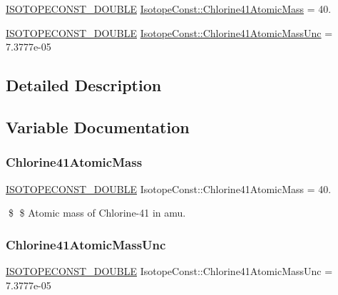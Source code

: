 \begin{DoxyCompactItemize}
\item 
\mbox{\hyperlink{group___isotope_const-_macros_ga8f45a7272ce02c0b4c65c44636ed719a}{I\+S\+O\+T\+O\+P\+E\+C\+O\+N\+S\+T\+\_\+\+D\+O\+U\+B\+LE}} \mbox{\hyperlink{group___isotope_const-_chlorine-_cl41_gad20dfc910df534dfd0835569b4ff3f56}{Isotope\+Const\+::\+Chlorine41\+Atomic\+Mass}} = 40.
\item 
\mbox{\hyperlink{group___isotope_const-_macros_ga8f45a7272ce02c0b4c65c44636ed719a}{I\+S\+O\+T\+O\+P\+E\+C\+O\+N\+S\+T\+\_\+\+D\+O\+U\+B\+LE}} \mbox{\hyperlink{group___isotope_const-_chlorine-_cl41_gacbdd18a715345a068255883a5b12e1d0}{Isotope\+Const\+::\+Chlorine41\+Atomic\+Mass\+Unc}} = 7.\+3777e-\/05
\end{DoxyCompactItemize}


\subsection{Detailed Description}


\subsection{Variable Documentation}
\mbox{\label{group___isotope_const-_chlorine-_cl41_gad20dfc910df534dfd0835569b4ff3f56}} 
\subsubsection{\texorpdfstring{Chlorine41\+Atomic\+Mass}{Chlorine41AtomicMass}}
{\footnotesize\ttfamily \mbox{\hyperlink{group___isotope_const-_macros_ga8f45a7272ce02c0b4c65c44636ed719a}{I\+S\+O\+T\+O\+P\+E\+C\+O\+N\+S\+T\+\_\+\+D\+O\+U\+B\+LE}} Isotope\+Const\+::\+Chlorine41\+Atomic\+Mass = 40.}

\$ \$ Atomic mass of Chlorine-\/41 in amu. \mbox{\label{group___isotope_const-_chlorine-_cl41_gacbdd18a715345a068255883a5b12e1d0}} 
\subsubsection{\texorpdfstring{Chlorine41\+Atomic\+Mass\+Unc}{Chlorine41AtomicMassUnc}}
{\footnotesize\ttfamily \mbox{\hyperlink{group___isotope_const-_macros_ga8f45a7272ce02c0b4c65c44636ed719a}{I\+S\+O\+T\+O\+P\+E\+C\+O\+N\+S\+T\+\_\+\+D\+O\+U\+B\+LE}} Isotope\+Const\+::\+Chlorine41\+Atomic\+Mass\+Unc = 7.\+3777e-\/05}

